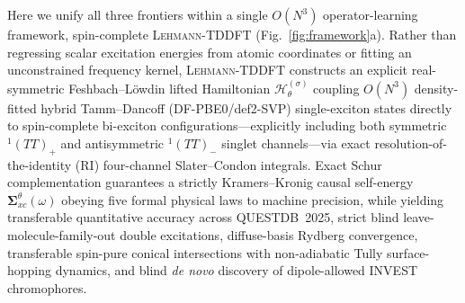 \documentclass[10pt,twocolumn]{article}
\theoremstyle{natthm}
\newcommand{\leh}{\textsc{Lehmann-TDDFT}}
\newcommand{\Sig}{\mathbf{\Sigma}_{xc}^{\theta}}
\newcommand{\Hlift}{\mathcal{H}_{\theta}^{(\sigma)}}
\begin{document}
Here we unify all three frontiers within a single $O(N^3)$ operator-learning framework, spin-complete \leh{} (Fig.~\ref{fig:framework}a).
Rather than regressing scalar excitation energies from atomic coordinates or fitting an unconstrained frequency kernel, \leh{} constructs an explicit real-symmetric Feshbach--L\"owdin lifted Hamiltonian\cite{feshbach1958,lowdin1962} $\Hlift$ coupling $O(N^3)$ density-fitted hybrid Tamm--Dancoff (DF-PBE0\cite{adamo1999pbe0}/def2-SVP\cite{weigend2005def2}) single-exciton states directly to spin-complete bi-exciton configurations---explicitly including both symmetric $^1(TT)_+$ and antisymmetric $^1(TT)_-$ singlet channels---via exact resolution-of-the-identity (RI)\cite{weigend2008jkfit} four-channel Slater--Condon integrals.
Exact Schur complementation guarantees a strictly Kramers--Kronig causal\cite{kronig1926,kramers1927} self-energy $\Sig(\omega)$ obeying five formal physical laws to machine precision, while yielding transferable quantitative accuracy across QUESTDB~2025\cite{loos2025quest}, strict blind leave-molecule-family-out double excitations, diffuse-basis Rydberg convergence\cite{rappoport2010svpd}, transferable spin-pure conical intersections with non-adiabatic Tully surface-hopping dynamics\cite{tully1990fssh,subotnik2016fssh,curchod2018namd}, and blind \emph{de novo} discovery of dipole-allowed INVEST chromophores.
\end{document}
